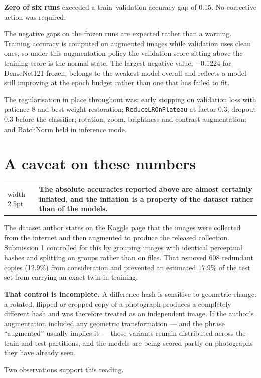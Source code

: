 \documentclass[11pt,a4paper]{article}
\makeatletter
\newenvironment{keybox}
  {\par\medskip\noindent\begin{tabular}{@{}p{0.3em}@{\hspace{0.8em}}p{\dimexpr\linewidth-2.2em}@{}}
   {\color{black}\vrule width 2.5pt} &}
  {\end{tabular}\par\medskip}
\makeatother
\begin{document}
\textbf{Zero of six runs} exceeded a train--validation accuracy gap of 0.15. No
corrective action was required.

The negative gaps on the frozen runs are expected rather than a warning. Training
accuracy is computed on augmented images while validation uses clean ones, so under this
augmentation policy the validation score sitting above the training score is the normal
state. The largest negative value, $-0.1224$ for DenseNet121 frozen, belongs to the
weakest model overall and reflects a model still improving at the epoch budget rather
than one that has failed to fit.

The regularisation in place throughout was: early stopping on validation loss with
patience 8 and best-weight restoration; \texttt{ReduceLROnPlateau} at factor 0.3; dropout
0.3 before the classifier; rotation, zoom, brightness and contrast augmentation; and
BatchNorm held in inference mode.

\section{A caveat on these numbers}
\label{sec:caveat}

\begin{keybox}
\textbf{The absolute accuracies reported above are almost certainly inflated, and the
inflation is a property of the dataset rather than of the models.}
\end{keybox}

The dataset author states on the Kaggle page that the images were collected from the
internet and then augmented to produce the released collection. Submission 1 controlled
for this by grouping images with identical perceptual hashes and splitting on groups
rather than on files. That removed 608 redundant copies (12.9\%) from consideration and
prevented an estimated 17.9\% of the test set from carrying an exact twin in training.

\textbf{That control is incomplete.} A difference hash is sensitive to geometric change:
a rotated, flipped or cropped copy of a photograph produces a completely different hash
and was therefore treated as an independent image. If the author's augmentation included
any geometric transformation --- and the phrase ``augmented'' usually implies it ---
those variants remain distributed across the train and test partitions, and the models
are being scored partly on photographs they have already seen.

Two observations support this reading.
\end{document}
